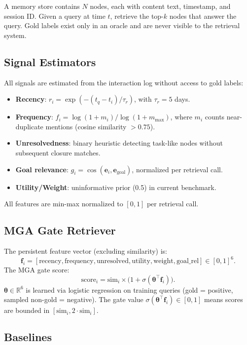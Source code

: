 \documentclass{article}
\begin{document}
A memory store contains $N$ nodes, each with content text, timestamp, and session ID. Given a query at time $t$, retrieve the top-$k$ nodes that answer the query. Gold labels exist only in an oracle and are never visible to the retrieval system.

\subsection{Signal Estimators}

All signals are estimated from the interaction log without access to gold labels:
\begin{itemize}[leftmargin=2em,itemsep=2pt]
\item \textbf{Recency}: $r_i = \exp(-(t_q - t_i) / \tau_r)$, with $\tau_r = 5$ days.
\item \textbf{Frequency}: $f_i = \log(1 + m_i) / \log(1 + m_{\max})$, where $m_i$ counts near-duplicate mentions (cosine similarity $> 0.75$).
\item \textbf{Unresolvedness}: binary heuristic detecting task-like nodes without subsequent closure matches.
\item \textbf{Goal relevance}: $g_i = \cos(\mathbf{e}_i, \mathbf{e}_{\text{goal}})$, normalized per retrieval call.
\item \textbf{Utility/Weight}: uninformative prior (0.5) in current benchmark.
\end{itemize}
All features are min-max normalized to $[0,1]$ per retrieval call.

\subsection{MGA Gate Retriever}

The persistent feature vector (excluding similarity) is:
\[
\mathbf{f}_i = [\text{recency}, \text{frequency}, \text{unresolved}, \text{utility}, \text{weight}, \text{goal\_rel}] \in [0,1]^6.
\]
The MGA gate score:
\begin{equation}
\text{score}_i = \text{sim}_i \times \bigl(1 + \sigma(\boldsymbol{\theta}^\top \mathbf{f}_i)\bigr).
\end{equation}
$\boldsymbol{\theta} \in \mathbb{R}^6$ is learned via logistic regression on training queries (gold = positive, sampled non-gold = negative). The gate value $\sigma(\boldsymbol{\theta}^\top \mathbf{f}_i) \in [0,1]$ means scores are bounded in $[\text{sim}_i, 2 \cdot \text{sim}_i]$.

\subsection{Baselines}
\end{document}
